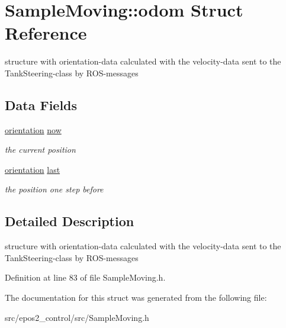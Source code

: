 \hypertarget{structSampleMoving_1_1odom}{\section{Sample\-Moving\-:\-:odom Struct Reference}
\label{structSampleMoving_1_1odom}
}


structure with orientation-\/data calculated with the velocity-\/data sent to the Tank\-Steering-\/class by R\-O\-S-\/messages  


\subsection*{Data Fields}
\begin{DoxyCompactItemize}
\item 
\hypertarget{structSampleMoving_1_1odom_aeebbed807958096ac7a676affca10901}{\hyperlink{structSampleMoving_1_1orientation}{orientation} \hyperlink{structSampleMoving_1_1odom_aeebbed807958096ac7a676affca10901}{now}}\label{structSampleMoving_1_1odom_aeebbed807958096ac7a676affca10901}

\begin{DoxyCompactList}\small\item\em the current position \end{DoxyCompactList}\item 
\hypertarget{structSampleMoving_1_1odom_a5a4a6741b9b5e5fb93fa21d962606c17}{\hyperlink{structSampleMoving_1_1orientation}{orientation} \hyperlink{structSampleMoving_1_1odom_a5a4a6741b9b5e5fb93fa21d962606c17}{last}}\label{structSampleMoving_1_1odom_a5a4a6741b9b5e5fb93fa21d962606c17}

\begin{DoxyCompactList}\small\item\em the position one step before \end{DoxyCompactList}\end{DoxyCompactItemize}


\subsection{Detailed Description}
structure with orientation-\/data calculated with the velocity-\/data sent to the Tank\-Steering-\/class by R\-O\-S-\/messages 

Definition at line 83 of file Sample\-Moving.\-h.



The documentation for this struct was generated from the following file\-:\begin{DoxyCompactItemize}
\item 
src/epos2\-\_\-control/src/Sample\-Moving.\-h\end{DoxyCompactItemize}
